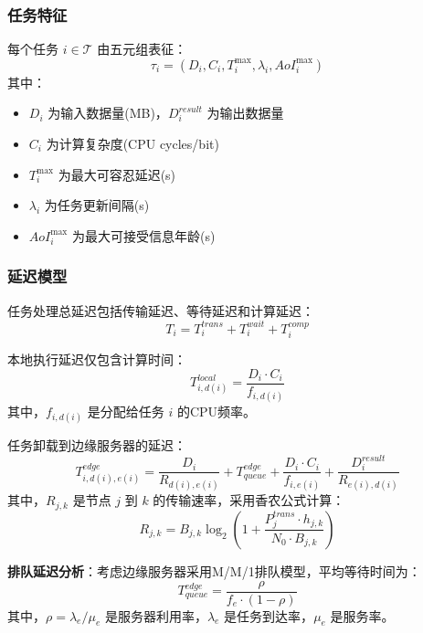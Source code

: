 \documentclass[conference]{IEEEtran}
\begin{document}
\subsubsection{任务特征}
每个任务 $i \in \mathcal{T}$ 由五元组表征：
\begin{equation}
\tau_i = (D_i, C_i, T_i^{\max}, \lambda_i, AoI_i^{\max})
\end{equation}
其中：
\begin{itemize}
    \item $D_i$ 为输入数据量(MB)，$D_i^{result}$ 为输出数据量
    \item $C_i$ 为计算复杂度(CPU cycles/bit)
    \item $T_i^{\max}$ 为最大可容忍延迟(s)
    \item $\lambda_i$ 为任务更新间隔(s)
    \item $AoI_i^{\max}$ 为最大可接受信息年龄(s)
\end{itemize}

\subsubsection{延迟模型}
任务处理总延迟包括传输延迟、等待延迟和计算延迟：
\begin{equation}
T_i = T_i^{trans} + T_i^{wait} + T_i^{comp}
\end{equation}

本地执行延迟仅包含计算时间：
\begin{equation}
T_{i,d(i)}^{local} = \frac{D_i \cdot C_i}{f_{i,d(i)}}
\end{equation}
其中，$f_{i,d(i)}$ 是分配给任务 $i$ 的CPU频率。

任务卸载到边缘服务器的延迟：
\begin{equation}
T_{i,d(i),e(i)}^{edge} = \frac{D_i}{R_{d(i),e(i)}} + T_{queue}^{edge} + \frac{D_i \cdot C_i}{f_{i,e(i)}} + \frac{D_i^{result}}{R_{e(i),d(i)}}
\end{equation}
其中，$R_{j,k}$ 是节点 $j$ 到 $k$ 的传输速率，采用香农公式计算：
\begin{equation}
R_{j,k} = B_{j,k} \log_2\left(1 + \frac{P_j^{trans} \cdot h_{j,k}}{N_0 \cdot B_{j,k}}\right)
\end{equation}

\textbf{排队延迟分析}：考虑边缘服务器采用M/M/1排队模型，平均等待时间为：
\begin{equation}
T_{queue}^{edge} = \frac{\rho}{f_e \cdot (1-\rho)}
\end{equation}
其中，$\rho = \lambda_e / \mu_e$ 是服务器利用率，$\lambda_e$ 是任务到达率，$\mu_e$ 是服务率。
\end{document}
